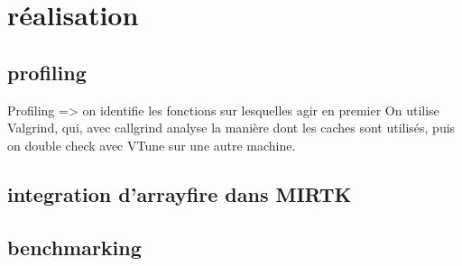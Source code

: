 \documentclass{report}
\begin{document}
\chapter{ réalisation}
	\section{profiling}
	Profiling => on identifie les fonctions sur lesquelles agir en premier
	On utilise Valgrind, qui, avec callgrind analyse la manière dont les caches sont utilisés, puis on double check avec VTune sur une autre machine.
	\section{integration d'arrayfire dans MIRTK}
	\section{benchmarking}
	 
	
\end{document}
